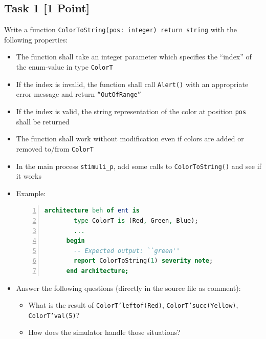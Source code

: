 \documentclass[12pt,epsf,makeidx,oneside]{book}
\begin{document}
\subsection{Task 1 [1 Point]}
  Write a function {\tt ColorToString(pos: integer) return string} with the following properties:
  \begin{itemize}[noitemsep]
    \item The function shall take an integer parameter which specifies the ``index'' of the enum-value in type {\tt ColorT} 
    \item If the index is invalid, the function shall call {\tt Alert()} with an appropriate error message and return {\tt ``OutOfRange''}
    \item If the index is valid, the string representation of the color at position {\tt pos} shall be returned
    \item The function shall work without modification even if colors are added or removed to/from {\tt ColorT}
    \item In the main process {\tt stimuli\_p}, add some calls to {\tt ColorToString()} and see if it works
    \item Example:
    \begin{lstlisting}[language=VHDL,gobble=6,numbers=left]
      architecture beh of ent is
        type ColorT is (Red, Green, Blue);
        ...
      begin
        -- Expected output: ``green''
        report ColorToString(1) severity note; 
      end architecture;
    \end{lstlisting}
    \item Answer the following questions (directly in the source file as comment):
    \begin{itemize}
      \item What is the result of {\tt ColorT'leftof(Red)}, {\tt ColorT'succ(Yellow)}, {\tt ColorT'val(5)}? 
      \item How does the simulator handle those situations?
    \end{itemize}
  \end{itemize}
\end{document}

